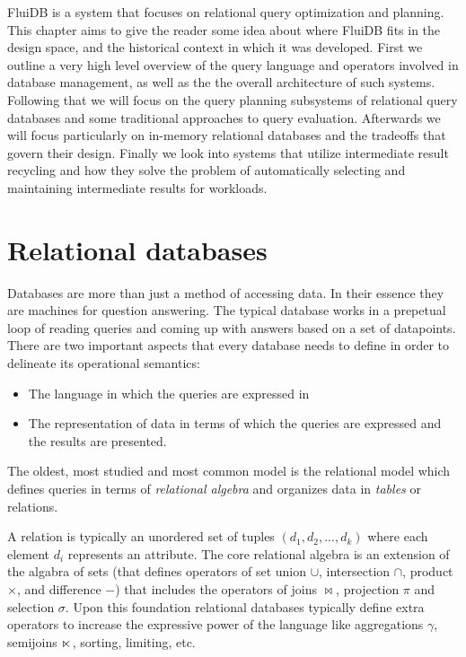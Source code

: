 
FluiDB is a system that focuses on relational query optimization and
planning. This chapter aims to give the reader some idea about where
FluiDB fits in the design space, and the historical context in which
it was developed.  First we outline a very high level overview of the
query language and operators involved in database management, as well
as the the overall architecture of such systems. Following that we
will focus on the query planning subsystems of relational query
databases and some traditional approaches to query
evaluation. Afterwards we will focus particularly on in-memory
relational databases and the tradeoffs that govern their
design. Finally we look into systems that utilize intermediate result
recycling and how they solve the problem of automatically selecting
and maintaining intermediate results for workloads.

\section{Relational databases}
\label{sec:org5af5e27}
Databases are more than just a method of accessing data. In their
essence they are machines for question answering. The typical database
works in a prepetual loop of reading queries and coming up with
answers based on a set of datapoints. There are two important aspects
that every database needs to define in order to delineate its
operational semantics:

\begin{itemize}
\item The language in which the queries are expressed in
\item The representation of data in terms of which the queries are
  expressed and the results are presented.
\end{itemize}

The oldest, most studied and most common model is the relational model
which defines queries in terms of \emph{relational algebra} and organizes
data in \emph{tables} or relations.

A relation is typically an unordered set of tuples
\((d_1,d_2,...,d_k)\) where each element \(d_i\) represents an
attribute. The core relational algebra is an extension of the algabra
of sets (that defines operators of set union \(\cup\), intersection
\(\cap\), product \(\times\), and difference \(-\)) that includes the
operators of joins \(\Join\), projection \(\pi\) and selection
\(\sigma\). Upon this foundation relational databases typically define
extra operators to increase the expressive power of the language like
aggregations \(\gamma\), semijoins \(\ltimes\), sorting, limiting, etc.

